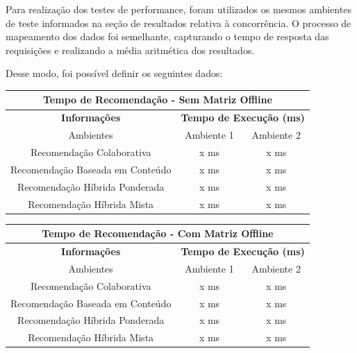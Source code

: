 Para realização dos testes de performance, foram utilizados os mesmos ambientes de teste informados na seção de resultados relativa à concorrência. O processo de mapeamento dos dados foi semelhante, capturando o tempo de resposta das requisições e realizando a média aritmética dos resultados.

Desse modo, foi possível definir os seguintes dados:

\begin{table}[]
\begin{tabular}{|c|c|c|}
\hline
\multicolumn{3}{|c|}{\textbf{Tempo de Recomendação - Sem Matriz Offline}}                    \\ \hline
\textbf{Informações}                  & \multicolumn{2}{c|}{\textbf{Tempo de Execução (ms)}} \\ \hline
Ambientes                             & Ambiente 1                & Ambiente 2               \\ \hline
Recomendação Colaborativa             & x ms                      & x ms                     \\ \hline
Recomendação Baseada em Conteúdo      & x ms                      & x ms                     \\ \hline
Recomendação Híbrida Ponderada        & x ms                      & x ms                     \\ \hline
Recomendação Híbrida Mista            & x ms                      & x ms                     \\ \hline
\end{tabular}
\end{table}

\begin{table}[]
\begin{tabular}{|c|c|c|}
\hline
\multicolumn{3}{|c|}{\textbf{Tempo de Recomendação - Com Matriz Offline}}                    \\ \hline
\textbf{Informações}                  & \multicolumn{2}{c|}{\textbf{Tempo de Execução (ms)}} \\ \hline
Ambientes                             & Ambiente 1                & Ambiente 2               \\ \hline
Recomendação Colaborativa             & x ms                      & x ms                     \\ \hline
Recomendação Baseada em Conteúdo      & x ms                      & x ms                     \\ \hline
Recomendação Híbrida Ponderada        & x ms                      & x ms                     \\ \hline
Recomendação Híbrida Mista            & x ms                      & x ms                     \\ \hline
\end{tabular}
\end{table}

